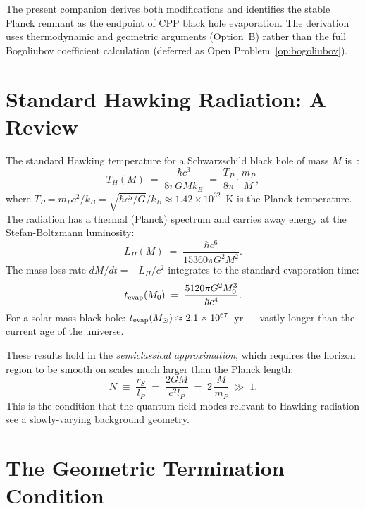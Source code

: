 \documentclass[12pt]{article}
\newcommand{\lP}{l_P}
\newcommand{\mP}{m_P}
\newcommand{\TP}{T_P}
\newcommand{\rS}{r_S}
\newcommand{\TH}{T_H}
\begin{document}
The present companion derives both modifications and identifies the
stable Planck remnant as the endpoint of CPP black hole evaporation.
The derivation uses thermodynamic and geometric arguments (Option~B)
rather than the full Bogoliubov coefficient calculation (deferred as
Open Problem~\ref{op:bogoliubov}).

\section{Standard Hawking Radiation: A Review}
\label{sec:hawking_review}

The standard Hawking temperature for a Schwarzschild black hole of
mass $M$ is~\cite{hawking1975,wald1984}:
\begin{equation}
  \TH(M) \;=\; \frac{\hbar c^3}{8\pi G M k_B}
  \;=\; \frac{\TP}{8\pi}\cdot\frac{\mP}{M},
  \label{eq:TH}
\end{equation}
where $\TP = \mP c^2/k_B = \sqrt{\hbar c^5/G}/k_B \approx 1.42\times 10^{32}$~K
is the Planck temperature.  The radiation has a thermal (Planck) spectrum
and carries away energy at the Stefan-Boltzmann luminosity:
\begin{equation}
  L_H(M) \;=\; \frac{\hbar c^6}{15360\pi G^2 M^2}.
  \label{eq:LH}
\end{equation}
The mass loss rate $dM/dt = -L_H/c^2$ integrates to the standard
evaporation time:
\begin{equation}
  t_{\rm evap}(M_0) \;=\; \frac{5120\pi G^2 M_0^3}{\hbar c^4}.
  \label{eq:tevap}
\end{equation}
For a solar-mass black hole: $t_{\rm evap}(M_\odot) \approx 2.1\times10^{67}$~yr
— vastly longer than the current age of the universe.

These results hold in the \emph{semiclassical approximation}, which
requires the horizon region to be smooth on scales much larger than
the Planck length:
\begin{equation}
  N \;\equiv\; \frac{\rS}{\lP} \;=\; \frac{2GM}{c^2\lP}
  \;=\; 2\,\frac{M}{\mP} \;\gg\; 1.
  \label{eq:N}
\end{equation}
This is the condition that the quantum field modes relevant to Hawking
radiation see a slowly-varying background geometry.

\section{The Geometric Termination Condition}
\label{sec:termination}
\end{document}
